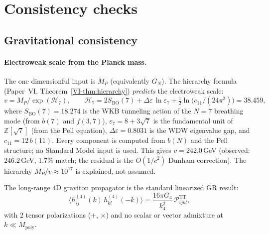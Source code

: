 


\section{Consistency checks}
\label{sec:consistency}

\subsection{Gravitational consistency}

\paragraph{Electroweak scale from the Planck mass.}
The one dimensionful input is $M_P$ (equivalently $G_N$).
The hierarchy formula (Paper~VI, Theorem~\ref*{VI-thm:hierarchy})
\emph{predicts} the electroweak scale:
\begin{equation}
  v = M_P / \exp(\mathcal{H}_7), \qquad
  \mathcal{H}_7 = 2S_{\mathrm{BO}}(7)
    + \Delta\varepsilon\,\ln\varepsilon_7
    + \tfrac{1}{2}\ln\bigl(c_{11}/(24\pi^2)\bigr)
  = 38.459,
\end{equation}
where $S_{\mathrm{BO}}(7) = 18.274$ is the WKB tunneling action
of the $N = 7$ breathing mode (from $b(7)$ and $f(3,7)$),
$\varepsilon_7 = 8 + 3\sqrt{7}$ is the fundamental unit of
$\mathbb{Z}[\sqrt{7}]$ (from the Pell equation),
$\Delta\varepsilon = 0.8031$ is the WDW eigenvalue gap,
and $c_{11} = 12\,b(11)$.
Every component is computed from $b(N)$
and the Pell structure; no Standard Model input is used.
This gives $v = 242.0$\,GeV (observed: $246.2$\,GeV,
$1.7\%$ match; the residual is the $O(1/c^2)$ Dunham correction).
The hierarchy $M_P/v \approx 10^{17}$ is explained,
not assumed.

\begin{proposition}
\label{prop:graviton-propagator}
The long-range $4$D graviton propagator is the standard linearized
GR result:
\begin{equation}\label{eq:graviton-propagator}
  \langle h^{(4)}_{ij}(k)\,h^{(4)}_{kl}(-k)\rangle
  = \frac{16\pi G_4}{k_4^2}\,\mathcal{P}^{\mathrm{TT}}_{ijkl},
\end{equation}
with $2$ tensor polarizations ($+$, $\times$) and no scalar or vector
admixture at $k \ll M_{\mathrm{poly}}$.
\end{proposition}

